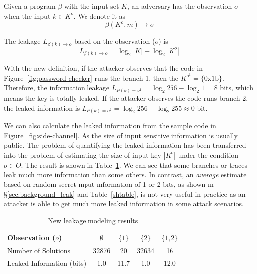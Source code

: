 \begin{mydef}
    \label{def}
    Given a program $\beta$ with the input set $K$,
    an adversary has the observation $o$ when the input $k{\in}K^o$.
    We denote it as
    $$\beta(K^o, m) \rightarrow	o$$

    The leakage $L_{\beta(k)\rightarrow o}$ based on the observation ($o$) is
    $$L_{\beta(k)\rightarrow o} = \log_2{|K|} - \log_2{|K^o|}$$
\end{mydef}

With the new definition, if the attacker observes that the
code in Figure~\ref{fig:password-checker} runs the branch 1, then the $K^{o^{1}} =
\{\mathrm{0x1b}\}$. Therefore, the information leakage $L_{P(k)=o^{1}} =
\log_2{256} - \log_2{1} = 8$ bits, which means the key is totally leaked. If the
attacker observes the code runs branch 2, the leaked information is
$L_{P(k)=o^{2}} = \log_2{256} - \log_2{255} \approx 0$ bit.


We can also calculate the leaked information from the sample code in
Figure~\ref{fig:side-channel}. As the size of input sensitive
information is usually public. The problem of quantifying the leaked information
has been transferred into the problem of estimating the size of input key
$|K^o|$ under the condition $o \in O$. The result is shown in
Table~\ref{shtable2}. We can see that some branches or traces leak much more
information than some others. In contrast, an \emph{average} estimate based on
random secret input information of 1 or 2 bits, as shown in
\S\ref{sec:background_leak} and Table~\ref{shtable}, is not very useful in
practice as an attacker is able to get much more leaked information in some
attack scenarios.

\begin{table}[ht]
    \centering
    \caption{New leakage modeling results}
    \label{shtable2}
    \begin{tabular}{l|cccc}
        \hline
        Observation ($o$)         & $\emptyset$ & ${\{1\}}$ & ${\{2\}}$ & ${\{1, 2\}}$ \\ \hline
        Number of Solutions       & 32876       & 20        & 32634     & 16           \\ \hline
        Leaked Information (bits) & 1.0         & 11.7      & 1.0       & 12.0         \\
        \hline
    \end{tabular}
\end{table}


